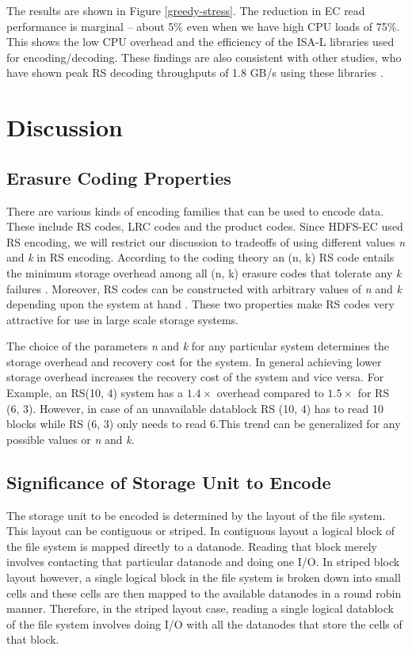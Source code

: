 \documentclass{sig-alternate-05-2015}
\begin{document}
The results are shown in Figure \ref{greedy-stress}. The reduction in EC read performance is marginal -- about 5\% even when we have high CPU loads of 75\%. This shows the low CPU overhead and the efficiency of the ISA-L libraries used for encoding/decoding. These findings are also consistent with other studies, who have shown peak RS decoding throughputs of 1.8 GB/s using these libraries \cite{cloudera-blog}.

\section{Discussion}

\subsection{Erasure Coding Properties}

There are various kinds of encoding families that can be used to encode data. These include RS codes, LRC codes and the product codes. Since HDFS-EC used RS encoding, we will restrict our discussion to tradeoffs of using different values \emph{n} and \emph{k} in RS encoding. According to the coding theory an (n, k) RS code entails the minimum storage overhead among all (n, k) erasure codes that tolerate any \emph{k} failures \cite{hitchhiker}. Moreover, RS codes can be constructed with arbitrary values of \emph{n} and \emph{k} depending upon the system at hand \cite{hitchhiker}. These two properties make RS codes very attractive for use in large scale storage systems. 


The choice of the parameters \emph{n} and \emph{k} for any particular system determines the storage overhead and recovery cost for the system. In general achieving lower storage overhead increases the recovery cost of the system and vice versa. For Example, an RS(10, 4) system has a $1.4\times $ overhead compared to $1.5\times $ for RS (6, 3). However, in case of an unavailable datablock RS (10, 4) has to read 10 blocks while RS (6, 3) only needs to read 6.This trend can be generalized for any possible values or \emph{n} and \emph{k}. 



\subsection{Significance of Storage Unit to Encode}

The storage unit to be encoded is determined by the layout of the file system. This layout can be contiguous or striped. In contiguous layout a logical block of the file system is mapped directly to a datanode. Reading that block merely involves contacting that particular datanode and doing one I/O.  In striped block layout however, a single logical block in the file system is broken down into small cells and these cells are then mapped to the available datanodes in a round robin manner. Therefore, in the striped layout case, reading a single logical datablock of the file system involves doing I/O with all the datanodes that store the cells of that block. 
\end{document}
